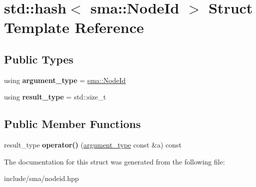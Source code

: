 \hypertarget{structstd_1_1hash_3_01sma_1_1NodeId_01_4}{\section{std\-:\-:hash$<$ sma\-:\-:Node\-Id $>$ Struct Template Reference}
\label{structstd_1_1hash_3_01sma_1_1NodeId_01_4}
}
\subsection*{Public Types}
\begin{DoxyCompactItemize}
\item 
\hypertarget{structstd_1_1hash_3_01sma_1_1NodeId_01_4_a5849f5c115a984c18ee9602524c83ba7}{using {\bfseries argument\-\_\-type} = \hyperlink{structsma_1_1NodeId}{sma\-::\-Node\-Id}}\label{structstd_1_1hash_3_01sma_1_1NodeId_01_4_a5849f5c115a984c18ee9602524c83ba7}

\item 
\hypertarget{structstd_1_1hash_3_01sma_1_1NodeId_01_4_a5cd146b670357fec00967b84286ae41c}{using {\bfseries result\-\_\-type} = std\-::size\-\_\-t}\label{structstd_1_1hash_3_01sma_1_1NodeId_01_4_a5cd146b670357fec00967b84286ae41c}

\end{DoxyCompactItemize}
\subsection*{Public Member Functions}
\begin{DoxyCompactItemize}
\item 
\hypertarget{structstd_1_1hash_3_01sma_1_1NodeId_01_4_a1a2bcc384669e25f2886fdddcf75c77c}{result\-\_\-type {\bfseries operator()} (\hyperlink{structsma_1_1NodeId}{argument\-\_\-type} const \&a) const }\label{structstd_1_1hash_3_01sma_1_1NodeId_01_4_a1a2bcc384669e25f2886fdddcf75c77c}

\end{DoxyCompactItemize}


The documentation for this struct was generated from the following file\-:\begin{DoxyCompactItemize}
\item 
include/sma/nodeid.\-hpp\end{DoxyCompactItemize}
